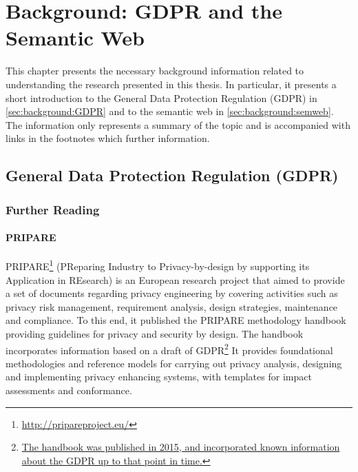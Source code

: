 \chapter{Background: GDPR and the Semantic Web}
\label{chapter:background}

This chapter presents the necessary background information related to understanding the research presented in this thesis. In particular, it presents a short introduction to the General Data Protection Regulation (GDPR) in \autoref{sec:background:GDPR} and to the semantic web in \autoref{sec:background:semweb}. The information only represents a summary of the topic and is accompanied with links in the footnotes which further information.

\section{General Data Protection Regulation (GDPR)}\label{sec:background:GDPR}

\subsection*{Further Reading}

\subsubsection{PRIPARE}
PRIPARE\footnote{\url{http://pripareproject.eu/}} (PReparing Industry to Privacy-by-design by supporting its Application in REsearch) is an European research project that aimed to provide a set of documents regarding privacy engineering by covering activities such as privacy risk management, requirement analysis, design strategies, maintenance and compliance. To this end, it published the PRIPARE methodology handbook \cite{noauthor_pripare-methodology-handbook-final-feb-24-2016.pdf_nodate} providing guidelines for privacy and security by design. The handbook incorporates information based on a draft of GDPR\footnote{\url{The handbook was published in 2015, and incorporated known information about the GDPR up to that point in time.}} It provides foundational methodologies and reference models for carrying out privacy analysis, designing and implementing privacy enhancing systems, with templates for impact assessments and conformance. 


